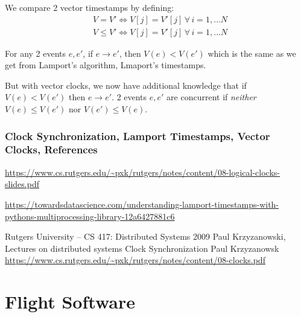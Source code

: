 \documentclass[10pt]{amsart}
\begin{document}
\begin{multicols*}{2}
We compare 2 vector timestamps by defining:
\begin{equation}
\begin{aligned} 
& V = V' \iff V[j] = V'[j] \, \forall \, i = 1, \dots N \\
& V\leq V' \iff V[j] = V'[j] \, \forall \, i = 1, \dots N
\end{aligned} 
\end{equation}

For any 2 events $e, e'$, if $e\to e'$, then $V(e) < V(e')$ which is the same as we get from Lamport's algorithm, Lmaport's timestamps.

But with vector clocks, we now have additional knowledge that if $V(e) < V(e')$ then $e\to e'$. 2 events $e, e'$ are concurrent if \emph{neither} $V(e) \leq V(e')$ nor $V(e') \leq V(e)$.




\section{Clock Synchronization, Lamport Timestamps, Vector Clocks, References}

\url{https://www.cs.rutgers.edu/~pxk/rutgers/notes/content/08-logical-clocks-slides.pdf}

\url{https://towardsdatascience.com/understanding-lamport-timestamps-with-pythons-multiprocessing-library-12a6427881c6}


Rutgers University – CS 417: Distributed Systems 2009 Paul Krzyzanowski, Lectures on distributed systems Clock Synchronization Paul Krzyzanowsk
\url{https://www.cs.rutgers.edu/~pxk/rutgers/notes/content/08-clocks.pdf}


\part{Flight Software}



\end{multicols*}
\end{document}
